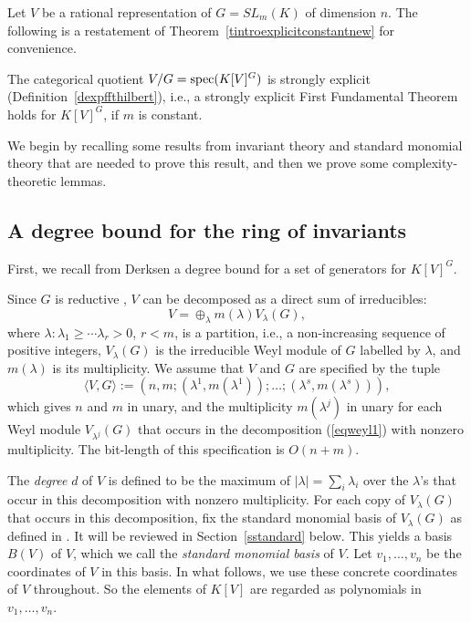 \documentclass[11pt]{article}
\begin{document}
Let $V$ be a rational  representation of $G=SL_m(K)$ of dimension $n$.
The following is a restatement of Theorem~\ref{tintroexplicitconstantnew} for convenience.


\begin{theorem} \label{texplicitconst0}
The categorical quotient $V/G={\mbox {spec}}(K[V]^G)$ is strongly explicit (Definition~\ref{dexpffthilbert}), i.e.,
a strongly explicit First Fundamental Theorem holds for $K[V]^G$,   if $m$ is constant. 
\end{theorem} 

We begin by recalling some results from invariant theory and standard monomial theory 
\cite{raghavan,doubillet} that are needed to prove this result, and then we prove some 
complexity-theoretic lemmas.

\subsection{A degree bound for the ring of invariants} \label{sdegreebound}
First, we recall from Derksen \cite{derksen} a degree bound for a set of generators for $K[V]^G$.

Since  $G$ is reductive \cite{fultonrepr}, 
$V$ can be decomposed  as a direct sum of irreducibles:
\begin{equation} \label{eqweyl1}
V=\oplus_{\lambda} m(\lambda) V_\lambda(G),
\end{equation} 
where $\lambda:\lambda_1 \ge \cdots \lambda_r>0$, $r <m$, is a partition, i.e., a non-increasing sequence 
of positive integers,  $V_\lambda(G)$ is the irreducible Weyl module \cite{fultonrepr} of $G$ labelled by $\lambda$,
and $m(\lambda)$ is its multiplicity. 
We assume that $V$ and $G$  are specified 
by the tuple
\begin{equation} \label{eqtuplenew}
 \langle V, G \rangle := (n,m; (\lambda^1,m(\lambda^1));\ldots; (\lambda^s,m(\lambda^s))),
\end{equation}
which   gives $n$ and $m$ in unary, and the 
multiplicity $m(\lambda^j)$ in unary for  each Weyl module $V_{\lambda^j}(G)$ that occurs in the 
decomposition  (\ref{eqweyl1}) with nonzero multiplicity.
The bit-length of this specification  is $O(n+m)$.

The {\em degree}  $d$ of $V$ is defined to be the maximum of $|\lambda|=\sum_i \lambda_i$ over  the $\lambda$'s that occur in this decomposition with nonzero 
multiplicity. 
For each copy of $V_\lambda(G)$ that occurs in this decomposition,
fix  the   standard monomial basis of $V_\lambda(G)$ as defined in \cite{raghavan}. It will be 
reviewed in Section~\ref{sstandard} below. 
This yields a basis $B(V)$ of $V$, which we call  the {\em standard monomial basis} of $V$. 
Let $v_1,\ldots,v_n$ be the coordinates of $V$ in this basis. In what follows, we use these concrete coordinates of $V$ throughout.
So the elements of $K[V]$ are regarded as polynomials in $v_1,\ldots,v_n$.
\end{document}
